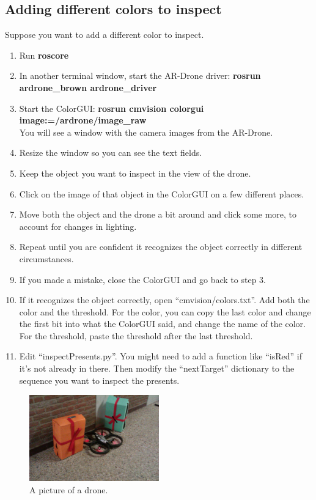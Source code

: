 \documentclass[a4paper,10pt]{article}
\begin{document}
\subsection{Adding different colors to inspect}
Suppose you want to add a different color to inspect.
\begin{enumerate}
\item Run \textbf{roscore}
\item In another terminal window, start the AR-Drone driver: \textbf{rosrun ardrone\_brown ardrone\_driver}
\item Start the ColorGUI: \textbf{rosrun cmvision colorgui image:=/ardrone/image\_raw} \\
      You will see a window with the camera images from the AR-Drone.
\item Resize the window so you can see the text fields.
\item Keep the object you want to inspect in the view of the drone.
\item Click on the image of that object in the ColorGUI on a few different places.
\item Move both the object and the drone a bit around and click some more, to account for changes in lighting.
\item Repeat until you are confident it recognizes the object correctly in different circumstances.
\item If you made a mistake, close the ColorGUI and go back to step 3.
\item If it recognizes the object correctly, open ``cmvision/colors.txt''. Add both the color and the threshold. For the color, you can copy the last color and change the first bit into what the ColorGUI said, and change the name of the color. For the threshold, paste the threshold after the last threshold.
\item Edit ``inspectPresents.py''. You might need to add a function like ``isRed'' if it's not already in there. Then modify the ``nextTarget'' dictionary to the sequence you want to inspect the presents.
\end{enumerate}

\begin{figure}[h!]
	\caption{A picture of a drone.}
	\centering
	\includegraphics[width=0.5\textwidth]{images/presentsAndDrone}
\end{figure}


\end{document}
